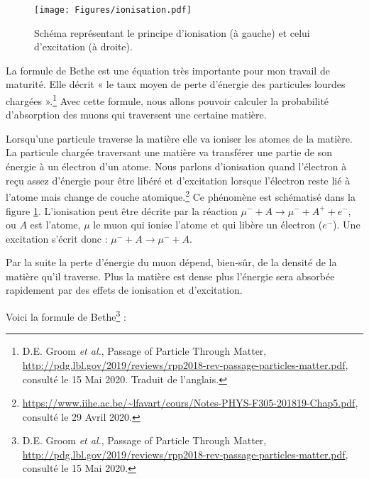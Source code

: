 \documentclass[a4paper, 12pt]{article}
\begin{document}
\begin{spacing}{1.5}
\begin{figure}[t]
\begin{center}
\texttt{[image: Figures/ionisation.pdf]}
\caption{\label{fig:ionisation} Schéma représentant le principe d'ionisation (à gauche) et celui d'excitation (à droite).}
\end{center}
\end{figure}
La formule de Bethe est une équation très importante pour mon travail de maturité. Elle décrit « le taux moyen de perte d'énergie des particules lourdes chargées ».\footnote{D.E. Groom \emph{et al.}, Passage of Particle Through Matter, \url{http://pdg.lbl.gov/2019/reviews/rpp2018-rev-passage-particles-matter.pdf}, consulté le 15 Mai 2020. Traduit de l'anglais.} Avec cette formule, nous allons pouvoir calculer la probabilité d'absorption des muons qui traversent une certaine matière.

Lorsqu'une particule traverse la matière elle va ioniser les atomes de la matière. La particule chargée traversant une matière va transférer une partie de son énergie à un électron d'un atome. Nous parlons d'ionisation quand l'électron à reçu assez d'énergie pour être libéré et d'excitation lorsque l'électron reste lié à l'atome mais change de couche atomique.\footnote{\url{https://www.iihe.ac.be/~lfavart/cours/Notes-PHYS-F305-201819-Chap5.pdf}, consulté le 29 Avril 2020.} Ce phénomène est schématisé dans la figure \ref{fig:ionisation}. L'ionisation peut être décrite par la réaction $\mu^- + A \rightarrow \mu^- + A^+ + e^- $, ou $A$ est l'atome, $\mu$ le muon qui ionise l'atome et qui libère un électron ($e^-$). Une excitation s'écrit donc : $\mu^- + A \rightarrow \mu^- + A$.


Par la suite la perte d'énergie du muon dépend, bien-sûr, de la densité de la matière qu'il traverse. Plus la matière est dense plus l'énergie sera absorbée rapidement par des effets de ionisation et d'excitation. 

Voici la formule de Bethe\footnote{D.E. Groom \emph{et al.}, Passage of Particle Through Matter, \url{http://pdg.lbl.gov/2019/reviews/rpp2018-rev-passage-particles-matter.pdf}, consulté le 15 Mai 2020.} : 


\end{spacing}
\end{document}
